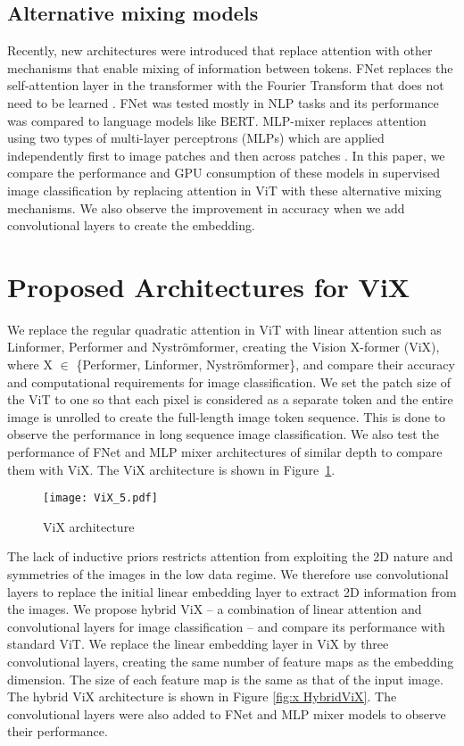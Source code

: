 \documentclass{article}
\begin{document}
\subsection{Alternative mixing models}
Recently, new architectures were introduced that replace attention with other mechanisms that enable mixing of information between tokens. FNet replaces the self-attention layer in the transformer with the Fourier Transform that does not need to be learned \cite{leethorp2021fnet}. FNet was tested mostly in NLP tasks and its performance was compared to language models like BERT. MLP-mixer replaces attention using two types of multi-layer perceptrons (MLPs) which are applied independently first to image patches and then across patches \cite{tolstikhin2021mlpmixer}. In this paper, we compare the performance and GPU consumption of these models in supervised image classification by replacing attention in ViT with these alternative mixing mechanisms. We also observe the improvement in accuracy when we add convolutional layers to create the embedding.



\section{Proposed Architectures for ViX}    


We replace the regular quadratic attention in ViT with linear attention such as Linformer, Performer and Nyströmformer, creating the Vision X-former (ViX), where X $\in$ \{Performer, Linformer, Nyströmformer\}, and compare their accuracy and computational requirements for image classification. We set the patch size of the ViT to one so that each pixel is considered as a separate token and the entire image is unrolled to create the full-length image token sequence. This is done to observe the performance in long sequence image classification. We also test the performance of FNet and MLP mixer architectures of similar depth to compare them with ViX. The ViX architecture is shown in Figure~\ref{fig:x ViX}.

\begin{figure}[h]
\centering
\texttt{[image: ViX\_5.pdf]}
\caption{ViX architecture}
\label{fig:x ViX}
\end{figure}

The lack of inductive priors restricts attention from exploiting the 2D nature and symmetries of the images in the low data regime. We therefore use convolutional layers to replace the initial linear embedding layer to extract 2D information from the images. We propose hybrid ViX -- a combination of linear attention and convolutional layers for image classification -- and compare its performance with standard ViT. We replace the linear embedding layer in ViX by three convolutional layers, creating the same number of feature maps as the embedding dimension. The size of each feature map is the same as that of the input image. The hybrid ViX architecture is shown in Figure \ref{fig:x HybridViX}. The convolutional layers were also added to FNet and MLP mixer models to observe their performance.
\end{document}
